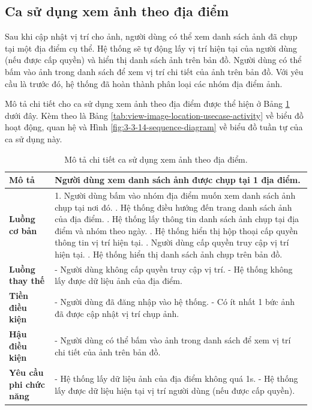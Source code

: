 \subsection{Ca sử dụng xem ảnh theo địa điểm}

Sau khi cập nhật vị trí cho ảnh, người dùng có thể xem danh sách ảnh đã chụp tại một địa điểm cụ thể. Hệ thống sẽ tự động lấy vị trí hiện tại của người dùng (nếu được cấp quyền) và hiển thị danh sách ảnh trên bản đồ. Người dùng có thể bấm vào ảnh trong danh sách để xem vị trí chi tiết của ảnh trên bản đồ. Với yêu cầu là trước đó, hệ thống đã hoàn thành phân loại các nhóm địa điểm ảnh.

Mô tả chi tiết cho ca sử dụng xem ảnh theo địa điểm được thể hiện ở Bảng \ref{tab:view-image-location-usecase} dưới đây. Kèm theo là Bảng \ref{tab:view-image-location-usecase-activity} về biểu đồ hoạt động, quan hệ và Hình \ref{fig:3-3-14-sequence-diagram} về biểu đồ tuần tự của ca sử dụng này. 

\noindent 
\begin{table}[H]
\centering
\begin{tabularx}{\linewidth}{| l | X |} 
\hline 
\textbf{Mô tả} & Người dùng xem danh sách ảnh được chụp tại 1 địa điểm. \\
\hline 
\textbf{Luồng cơ bản} & 1. Người dùng bấm vào nhóm địa điểm muốn xem danh sách ảnh chụp tại nơi đó. \newline
                       2. Hệ thống điều hướng đến trang danh sách ảnh của địa điểm. \newline
                       3. Hệ thống lấy thông tin danh sách ảnh chụp tại địa điểm và nhóm theo ngày. \newline
                       4. Hệ thống hiển thị hộp thoại cấp quyền thông tin vị trí hiện tại. \newline
                       5. Người dùng cấp quyền truy cập vị trí hiện tại. \newline
                       6. Hệ thống hiển thị danh sách ảnh chụp trên bản đồ. \\
\hline
\textbf{Luồng thay thế} & - Người dùng không cấp quyền truy cập vị trí. \newline
                          - Hệ thống không lấy được dữ liệu ảnh của địa điểm. \\
\hline
\textbf{Tiền điều kiện} & - Người dùng đã đăng nhập vào hệ thống. \newline
                          - Có ít nhất 1 bức ảnh đã được cập nhật vị trí chụp ảnh. \\
\hline
\textbf{Hậu điều kiện} & - Người dùng có thể bấm vào ảnh trong danh sách để xem vị trí chi tiết của ảnh trên bản đồ. \\
\hline 
\textbf{Yêu cầu phi chức năng} & - Hệ thống lấy dữ liệu ảnh của địa điểm không quá 1s. \newline
                           - Hệ thống lấy được dữ liệu hiện tại vị trí người dùng (nếu được cấp quyền). \\
\hline 
\end{tabularx}
\caption{Mô tả chi tiết ca sử dụng xem ảnh theo địa điểm.}
\label{tab:view-image-location-usecase}
\end{table}


